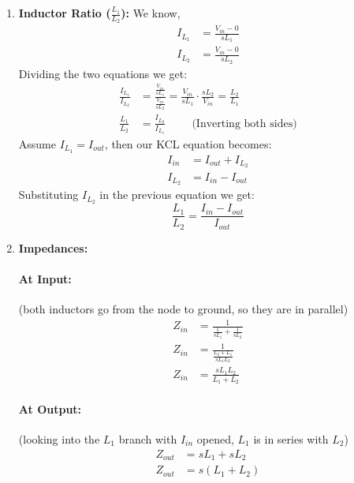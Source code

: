 \begin{enumerate}
  \item \textbf{Inductor Ratio (\(\frac{L_1}{L_2}\)):}
    We know,
    \begin{align*}
      I_{L_1} &= \frac{V_{in} - 0}{sL_1} \\
      I_{L_2} &= \frac{V_{in} - 0}{sL_2}
    \end{align*}
    Dividing the two equations we get:
    \begin{align*}
      \frac{I_{L_1}}{I_{L_2}} &= \frac{\frac{V_{in}}{sL_1}}{\frac{V_{in}}{sL_2}} = \frac{V_{in}}{sL_1} \cdot \frac{sL_2}{V_{in}} = \frac{L_2}{L_1} \\
      \frac{L_1}{L_2} &= \frac{I_{L_2}}{I_{L_1}} \hspace{1cm} \text{(Inverting both sides)}
    \end{align*}
    Assume \(I_{L_1} = I_{out}\), then our KCL equation
    becomes:
    \begin{align*}
      I_{in} &= I_{out} + I_{L_2} \\
      I_{L_2} &= I_{in} - I_{out}
    \end{align*}
    Substituting \(I_{L_2}\) in the previous equation
    we get:
    \[
      \frac{L_1}{L_2} = \frac{I_{in} - I_{out}}{I_{out}}
    \]
  \item \textbf{Impedances:}
    \paragraph{At Input:} (both inductors go from the node to ground, so
    they are in parallel)
      \begin{align*}
        Z_{in} &= \frac{1}{\frac{1}{sL_1} + \frac{1}{sL_2}} \\
        Z_{in} &= \frac{1}{\frac{L_2 + L_1}{sL_1 L_2}} \\
        Z_{in} &= \frac{sL_1 L_2}{L_1 + L_2}
      \end{align*}
    \paragraph{At Output:} (looking into the \(L_1\) branch with \(I_{in}\)
    opened, \(L_1\) is in series with \(L_2\))
      \begin{align*}
        Z_{out} &= sL_1 + sL_2 \\
        Z_{out} &= s(L_1 + L_2)
      \end{align*}
\end{enumerate}

